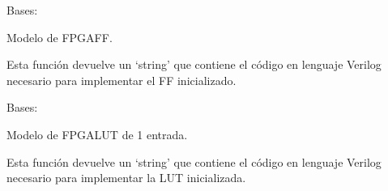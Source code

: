 \documentclass[letterpaper,10pt,english]{sphinxmanual}
\begin{document}
\begin{fulllineitems}
\label{\detokenize{myfpga:myfpga.FlipFlop}}
\pysigstartsignatures
{}
\pysigstopsignatures
\sphinxAtStartPar
Bases: 

\sphinxAtStartPar
Modelo de FPGA\sphinxhyphen{}FF.

\begin{fulllineitems}
\label{\detokenize{myfpga:myfpga.FlipFlop.impl}}
\pysigstartsignatures
{}
\pysigstopsignatures
\sphinxAtStartPar
Esta función devuelve un ‘string’ que contiene el código en lenguaje
Verilog necesario para implementar el FF inicializado.

\end{fulllineitems}


\end{fulllineitems}


\begin{fulllineitems}
\label{\detokenize{myfpga:myfpga.Lut1}}
\pysigstartsignatures
{}
\pysigstopsignatures
\sphinxAtStartPar
Bases: 

\sphinxAtStartPar
Modelo de FPGA\sphinxhyphen{}LUT de 1 entrada.

\begin{fulllineitems}
\label{\detokenize{myfpga:myfpga.Lut1.impl}}
\pysigstartsignatures
{}
\pysigstopsignatures
\sphinxAtStartPar
Esta función devuelve un ‘string’ que contiene el código en lenguaje 
Verilog necesario para implementar la LUT inicializada.

\end{fulllineitems}


\end{fulllineitems}
\end{document}
